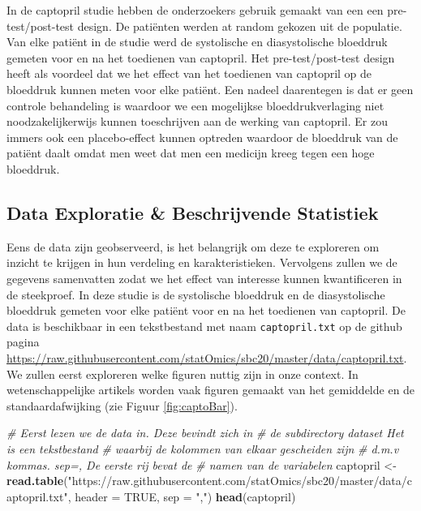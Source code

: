 \documentclass[
  12pt,dutch,coursenotes]{book}
\newenvironment{Shaded}{\begin{snugshade}}{\end{snugshade}}
\newcommand{\CommentTok}[1]{\textcolor[rgb]{0.56,0.35,0.01}{\textit{#1}}}
\newcommand{\DataTypeTok}[1]{\textcolor[rgb]{0.13,0.29,0.53}{#1}}
\newcommand{\KeywordTok}[1]{\textcolor[rgb]{0.13,0.29,0.53}{\textbf{#1}}}
\newcommand{\NormalTok}[1]{#1}
\newcommand{\OtherTok}[1]{\textcolor[rgb]{0.56,0.35,0.01}{#1}}
\newcommand{\StringTok}[1]{\textcolor[rgb]{0.31,0.60,0.02}{#1}}
\theoremstyle{definition}
\theoremstyle{definition}
\theoremstyle{definition}
\theoremstyle{remark}
\begin{document}
In de captopril studie hebben de onderzoekers gebruik gemaakt van een een pre-test/post-test design.
De patiënten werden at random gekozen uit de populatie.
Van elke patiënt in de studie werd de systolische en diasystolische bloeddruk gemeten voor en na het toedienen van captopril.
Het pre-test/post-test design heeft als voordeel dat we het effect van het toedienen van captopril op de bloeddruk kunnen meten voor elke patiënt. Een nadeel daarentegen is dat er geen controle behandeling is waardoor we een mogelijkse bloeddrukverlaging niet noodzakelijkerwijs kunnen toeschrijven aan de werking van captopril. Er zou immers ook een placebo-effect kunnen optreden waardoor de bloeddruk van de patiënt daalt omdat men weet dat men een medicijn kreeg tegen een hoge bloeddruk.

\hypertarget{data-exploratie-beschrijvende-statistiek}{%
\subsection{Data Exploratie \& Beschrijvende Statistiek}\label{data-exploratie-beschrijvende-statistiek}}

Eens de data zijn geobserveerd, is het belangrijk om deze te exploreren om inzicht te krijgen in hun verdeling en karakteristieken.
Vervolgens zullen we de gegevens samenvatten zodat we het effect van interesse kunnen kwantificeren in de steekproef.
In deze studie is de systolische bloeddruk en de diasystolische bloeddruk gemeten voor elke patiënt voor en na het toedienen van captopril.
De data is beschikbaar in een tekstbestand met naam \texttt{captopril.txt} op de github pagina \url{https://raw.githubusercontent.com/statOmics/sbc20/master/data/captopril.txt}.
We zullen eerst exploreren welke figuren nuttig zijn in onze context.
In wetenschappelijke artikels worden vaak figuren gemaakt van het gemiddelde en de standaardafwijking (zie Figuur \ref{fig:captoBar}).

\begin{Shaded}
\begin{Highlighting}[]
\CommentTok{\# Eerst lezen we de data in. Deze bevindt zich in}
\CommentTok{\# de subdirectory dataset Het is een tekstbestand}
\CommentTok{\# waarbij de kolommen van elkaar gescheiden zijn}
\CommentTok{\# d.m.v kommas. sep=\textquotesingle{},\textquotesingle{} De eerste rij bevat de}
\CommentTok{\# namen van de variabelen}
\NormalTok{captopril \textless{}{-}}\StringTok{ }\KeywordTok{read.table}\NormalTok{(}\StringTok{"https://raw.githubusercontent.com/statOmics/sbc20/master/data/captopril.txt"}\NormalTok{, }
    \DataTypeTok{header =} \OtherTok{TRUE}\NormalTok{, }\DataTypeTok{sep =} \StringTok{","}\NormalTok{)}
\KeywordTok{head}\NormalTok{(captopril)}
\end{Highlighting}
\end{Shaded}
\end{document}

